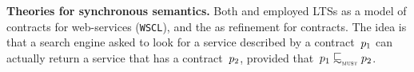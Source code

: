 





{\bfseries Theories for synchronous semantics.}
Both \cite{DBLP:conf/concur/LaneveP07} and
\cite{DBLP:journals/toplas/CastagnaGP09} employed LTSs as a model of
contracts for web-services (\ie \texttt{WSCL}), and the \mustpreorder
as refinement for contracts.  The idea is that a search engine asked
to look for a service described by a contract~$p_1$ can
actually return a service that has a contract~$p_2$, provided
that~$\server_1 \testleqS \server_2$.

